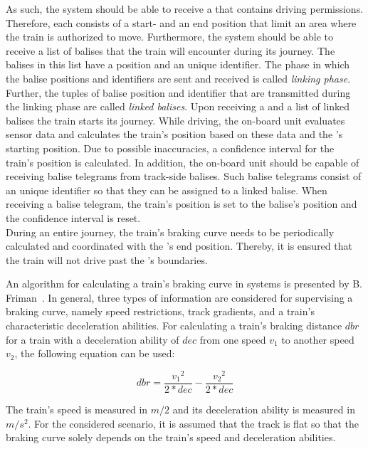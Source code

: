 As such, the system should be able to receive a  that contains driving permissions.
Therefore, each  consists of a start- and an end position that limit an area where the train is authorized to move.
Furthermore, the system should be able to receive a list of balises that the train will encounter during its journey.
The balises in this list have a position and an unique identifier.
The phase in which the balise positions and identifiers are sent and received is called \textit{linking phase}.
Further, the tuples of balise position and identifier that are transmitted during the linking phase are called \textit{linked balises}.
Upon receiving a  and a list of linked balises the train starts its journey.
While driving, the on-board unit evaluates sensor data and calculates the train's position based on these data and the 's starting position.
Due to possible inaccuracies, a confidence interval for the train's position is calculated.
In addition, the on-board unit should be capable of receiving balise telegrams from track-side balises.
Such balise telegrams consist of an unique identifier so that they can be assigned to a linked balise.
When receiving a balise telegram, the train's position is set to the balise's position and the confidence interval is reset.
\\

During an entire journey, the train's braking curve needs to be periodically calculated and coordinated with the 's end position.
Thereby, it is ensured that the train will not drive past the 's boundaries.

An algorithm for calculating a train's braking curve in  systems is presented by B. Friman~\cite{CalculateBrakeCurveFriman}.
In general, three types of information are considered for supervising a braking curve, namely speed restrictions, track gradients, and a train's characteristic deceleration abilities.
For calculating a train's braking distance $dbr$ for a train with a deceleration ability of $dec$ from one speed $v_1$ to another speed $v_2$, the following equation can be used:

\begin{equation}
dbr = \frac{{v_1}^2}{2*dec} - \frac{{v_2}^2}{2*dec}
\end{equation}

The train's speed is measured in $m/2$ and its deceleration ability is measured in $m/s^2$.
For the considered scenario, it is assumed that the track is flat so that the braking curve solely depends on the train's speed and deceleration abilities.
\\

